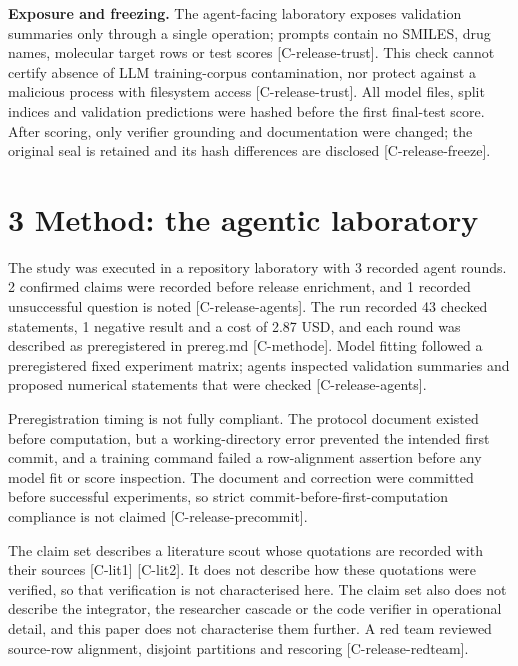 \documentclass[10pt,twocolumn]{article}
\begin{document}
\textbf{Exposure and freezing.} The agent-facing laboratory exposes validation summaries only through a single operation; prompts contain no SMILES, drug names, molecular target rows or test scores {\scriptsize[C-release-trust]}. This check cannot certify absence of LLM training-corpus contamination, nor protect against a malicious process with filesystem access {\scriptsize[C-release-trust]}. All model files, split indices and validation predictions were hashed before the first final-test score. After scoring, only verifier grounding and documentation were changed; the original seal is retained and its hash differences are disclosed {\scriptsize[C-release-freeze]}.

\section{3 Method: the agentic laboratory}

The study was executed in a repository laboratory with 3 recorded agent rounds. 2 confirmed claims were recorded before release enrichment, and 1 recorded unsuccessful question is noted {\scriptsize[C-release-agents]}. The run recorded 43 checked statements, 1 negative result and a cost of 2.87 USD, and each round was described as preregistered in prereg.md {\scriptsize[C-methode]}. Model fitting followed a preregistered fixed experiment matrix; agents inspected validation summaries and proposed numerical statements that were checked {\scriptsize[C-release-agents]}.

Preregistration timing is not fully compliant. The protocol document existed before computation, but a working-directory error prevented the intended first commit, and a training command failed a row-alignment assertion before any model fit or score inspection. The document and correction were committed before successful experiments, so strict commit-before-first-computation compliance is not claimed {\scriptsize[C-release-precommit]}.

The claim set describes a literature scout whose quotations are recorded with their sources {\scriptsize[C-lit1]} {\scriptsize[C-lit2]}. It does not describe how these quotations were verified, so that verification is not characterised here. The claim set also does not describe the integrator, the researcher cascade or the code verifier in operational detail, and this paper does not characterise them further. A red team reviewed source-row alignment, disjoint partitions and rescoring {\scriptsize[C-release-redteam]}.
\end{document}
